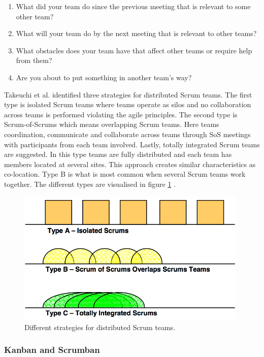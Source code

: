\begin{enumerate}
  \item What did your team do since the previous meeting that is relevant to some other team?
  \item What will your team do by the next meeting that is relevant to other teams?
  \item What obstacles does your team have that affect other teams or require help from them?
  \item Are you about to put something in another team's way?
\end{enumerate}

Takeuchi et al. identified three strategies for distributed Scrum teams. The first type is isolated Scrum teams where teams operate as silos and no collaboration across teams is performed violating the agile principles. The second type is Scrum-of-Scrums which means overlapping Scrum teams. Here teams coordination, communicate and collaborate across teams through SoS meetings with participants from each team involved. Lastly, totally integrated Scrum teams are suggested. In this type teams are fully distributed and each team has members located at several sites. This approach creates similar characteristics as co-location. Type B is what is most common when several Scrum teams work together. The different types are visualised in figure \ref{distributedscrum} \cite{takeuchi2004}.

\begin{figure}
\centering
\includegraphics[width=110mm]{images/distributed_scrum.png}
\caption{Different strategies for distributed Scrum teams.}
\label{distributedscrum}
\end{figure}

\subsubsection{Kanban and Scrumban}

